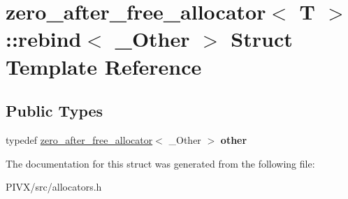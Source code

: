 \hypertarget{structzero__after__free__allocator_1_1rebind}{}\section{zero\+\_\+after\+\_\+free\+\_\+allocator$<$ T $>$\+:\+:rebind$<$ \+\_\+\+Other $>$ Struct Template Reference}
\label{structzero__after__free__allocator_1_1rebind}
\subsection*{Public Types}
\begin{DoxyCompactItemize}
\item 
\mbox{\label{structzero__after__free__allocator_1_1rebind_aef5ba2251ba370df22fbd0a05e3cf284}} 
typedef \mbox{\hyperlink{structzero__after__free__allocator}{zero\+\_\+after\+\_\+free\+\_\+allocator}}$<$ \+\_\+\+Other $>$ {\bfseries other}
\end{DoxyCompactItemize}


The documentation for this struct was generated from the following file\+:\begin{DoxyCompactItemize}
\item 
P\+I\+V\+X/src/allocators.\+h\end{DoxyCompactItemize}
